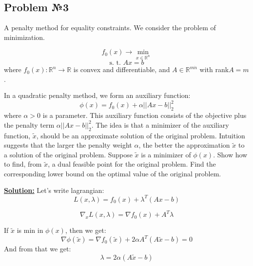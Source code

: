\subsection{Problem №3}
A penalty method for equality constraints. We consider the problem of minimization.

\begin{equation*}
f_0(x) \rightarrow \min_{x \in \mathds{R}^n}
\end{equation*}
\begin{equation*}
    \text{s. t. } Ax = b
\end{equation*}
where $f_0(x) : \mathds{R}^n \xrightarrow{} \mathds{R}$ is convex and differentiable, and $A \in \mathds{R}^{m \dot n}$ with rank$A = m$.

In a quadratic penalty method, we form an auxiliary function:
\begin{equation*}
    \phi (x) = f_0(x) + \alpha ||Ax - b||_2^2
\end{equation*}
where $\alpha > 0$ is a parameter. This auxiliary function consists of the objective plus the penalty term $\alpha ||Ax - b||_2^2$. The idea is that a minimizer of the auxiliary function, $\widetilde{x}$, should be an approximate solution of the original problem. Intuition suggests that the larger the penalty weight $\alpha$, the better the approximation $\widetilde{x}$ to a solution of the original problem. Suppose $\widetilde{x}$ is a minimizer of $\phi(x)$. Show how to find, from $\widetilde{x}$, a dual feasible point for the original problem. Find the corresponding lower bound on the optimal value of the original problem.

\underline{\textbf{Solution:}}
Let's write lagrangian:
\begin{equation*}
    L(x, \lambda) = f_0(x) + \lambda^T(Ax -b )
\end{equation*}

\begin{equation*}
\nabla_x L(x, \lambda) = \nabla f_0(x) + A^T \lambda    
\end{equation*}

If $\widetilde{x}$ is min in $\phi(x)$, then we get:
\begin{equation*}
    \nabla \phi(\widetilde{x}) = \nabla f_0(\widetilde{x}) + 2\alpha A^T(A\widetilde{x} - b) = 0
\end{equation*}
And from that we get:
\begin{equation*}
    \lambda  = 2 \alpha(A\widetilde{x} -b)
\end{equation*}

